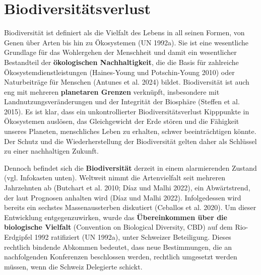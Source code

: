\documentclass[
  nswissgerman,
  a4paper,
  DIV=11,
  numbers=noendperiod,
  oneside,
  openany]{scrreprt}
\begin{document}
\section{Biodiversitätsverlust}\label{biodiversituxe4tsverlust}

Biodiversität ist definiert als die Vielfalt des Lebens in all seinen
Formen, von Genen über Arten bis hin zu Ökosystemen (UN 1992a). Sie ist
eine wesentliche Grundlage für das Wohlergehen der Menschheit und damit
ein wesentlicher Bestandteil der \textbf{ökologischen Nachhaltigkeit},
die die Basis für zahlreiche Ökosystemdienstleistungen (Haines-Young und
Potschin-Young 2010) oder Naturbeiträge für Menschen (Antunes et al.
2024) bildet. Biodiversität ist auch eng mit mehreren \textbf{planetaren
Grenzen} verknüpft, insbesondere mit Landnutzungsveränderungen und der
Integrität der Biosphäre ({Steffen et al.} 2015). Es ist klar, dass ein
unkontrollierter Biodiversitätsverlust Kipppunkte in Ökosystemen
auslösen, das Gleichgewicht der Erde stören und die Fähigkeit unseres
Planeten, menschliches Leben zu erhalten, schwer beeinträchtigen könnte.
Der Schutz und die Wiederherstellung der Biodiversität gelten daher als
Schlüssel zu einer nachhaltigen Zukunft.

Dennoch befindet sich die \textbf{Biodiversität} derzeit in einem
alarmierenden Zustand (vgl. Infokasten unten). Weltweit nimmt die
Artenvielfalt seit mehreren Jahrzehnten ab ({Butchart et al.} 2010; Díaz
und Malhi 2022), ein Abwärtstrend, der laut Prognosen anhalten wird
(Díaz und Malhi 2022). Infolgedessen wird bereits ein sechstes
Massenaussterben diskutiert (Ceballos et al. 2020). Um dieser
Entwicklung entgegenzuwirken, wurde das \textbf{Übereinkommen über die
biologische Vielfalt} (Convention on Biological Diversity, CBD) auf dem
Rio-Erdgipfel 1992 ratifiziert (UN 1992a), unter Schweizer Beteiligung.
Dieses rechtlich bindende Abkommen bedeutet, dass neue Bestimmungen, die
an nachfolgenden Konferenzen beschlossen werden, rechtlich umgesetzt
werden müssen, wenn die Schweiz Delegierte schickt.
\end{document}
